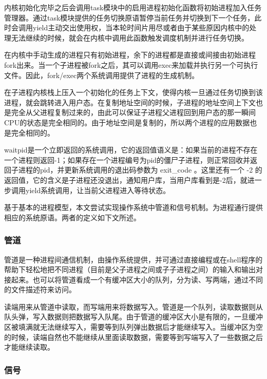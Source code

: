内核初始化完毕之后会调用task模块中的启用进程初始化函数将初始进程加入任务管理器。通过task模块提供的任务切换原语暂停当前任务并切换到下一个任务，此时会调用yield主动交出使用权，当本轮时间片用尽或者由于某些原因内核中的处理无法继续的时候，就会在内核中调用此函数触发调度机制并进行任务切换。

在内核中手动生成的进程只有初始进程，余下的进程都是直接或间接由初始进程fork出来。当一个子进程被fork之后，其可以调用exec来加载并执行另一个可执行文件。因此，fork/exec两个系统调用提供了进程的生成机制。

在子进程内核栈上压入一个初始化的任务上下文，使得内核一旦通过任务切换到该进程，就会跳转进入用户态。在复制地址空间的时候，子进程的地址空间上下文也是完全从父进程复制过来的，由此可以保证子进程父进程回到用户态的那一瞬间CPU的状态是完全相同的。由于地址空间是复制的，所以两个进程的应用数据也是完全相同的。

waitpid是一个立即返回的系统调用，它的返回值语义是：如果当前的进程不存在一个进程则返回-1；如果存在一个进程编号为pid的僵尸子进程，则正常回收并返回子进程的pid，并更新系统调用的退出码参数为 exit\_code 。这里还有一个 -2 的返回值，它的含义是子进程还没退出，通知用户库，当用户库看到是-2后，就进一步调用yield系统调用，让当前父进程进入等待状态。

基于基本的进程模型，本文尝试实现操作系统中管道和信号机制。为进程通行提供相应的系统原语。两者的定义如下文所述。

\subsubsection{管道}


管道是一种进程间通信机制，由操作系统提供，并可通过直接编程或在shell程序的帮助下轻松地把不同进程（目前是父子进程之间或子子进程之间）的输入和输出对接起来。也可以将管道看成一个有缓冲区大小的队列，分为读、写两端，通过不同的文件描述符来访问。

读端用来从管道中读取，而写端用来将数据写入。管道是一个队列，读取数据则从队头弹，写入数据则把数据写入队尾。由于管道的缓冲区大小是有限的，一旦缓冲区被填满就无法继续写入，需要等到队列弹出数据后才能继续写入。当缓冲区为空的时候，读端自然也不能继续从里面读取数据，需要等到写端写入了一些数据之后才能继续读取。

\subsubsection{信号}

